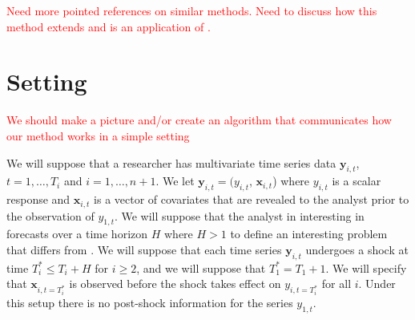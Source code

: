 \documentclass[11pt]{article}
\newcommand{\x}{\textbf{x}}
\newcommand{\y}{\textbf{y}}
\theoremstyle{definition}
\begin{document}
\vspace*{0.5cm}\noindent\textcolor{red}{Need more pointed references on similar methods. Need to discuss how this method extends \cite{lin2021minimizing} and is an application of \cite{quaedvlieg2021multi}.}



\section{Setting}
\label{section2}

\textcolor{red}{We should make a picture and/or create an algorithm that communicates how our method works in a simple setting} \vspace*{0.5cm}


We will suppose that a researcher has multivariate time series data $\y_{i,t}$, $t = 1, \ldots,  T_i$ and $i = 1, \ldots, n+1$. We let $\y_{i,t} = (y_{i,t}$, $\x_{i,t}$) where $y_{i,t}$ is a scalar response and $\x_{i,t}$ is a vector of covariates that are revealed to the analyst prior to the observation of $y_{1,t}$.  We will suppose that the analyst in interesting in forecasts over a time horizon $H$ where $H > 1$ to define an interesting problem that differs from \cite{lin2021minimizing}.
We will suppose that each time series $\y_{i,t}$ undergoes a shock at time $T^*_i \leq T_i + H$ for $i \geq 2$, and we will suppose that $T^*_1 = T_1 + 1$. 
We will specify that $\x_{i,t=T^*_i}$ is observed before the shock takes effect on $y_{i,t=T^*_i}$ for all $i$. Under this setup there is no post-shock information for the series $y_{1,t}$. 
\end{document}
